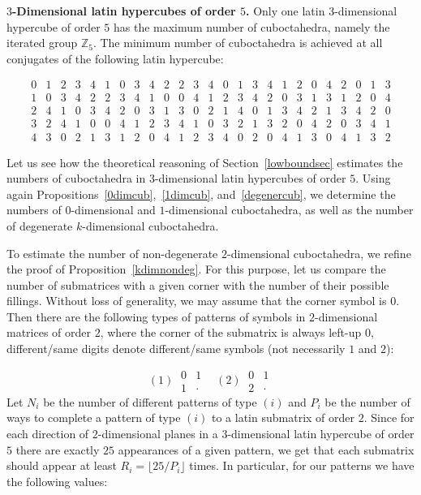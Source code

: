 \documentclass[a4paper]{article}
\begin{document}
\textbf{$3$-Dimensional latin hypercubes of order $5$.}   
Only  one latin $3$-dimensional  hypercube of order $5$ has the maximum number of cuboctahedra,  namely the iterated group $\mathbb{Z}_5$. The minimum number of cuboctahedra is achieved at all   conjugates of  the following latin hypercube:

$$
\begin{array}{ccccc|ccccc|ccccc|ccccc|ccccc}
0 & 1 & 2 & 3 & 4 &  1 & 0 & 3 & 4 & 2 &  2 & 3 & 4 & 0 & 1 &  3 & 4 & 1 & 2 & 0 &  4 & 2 & 0 & 1 & 3 \\
1 & 0 & 3 & 4 & 2 &  2 & 3 & 4 & 1 & 0 &  0 & 4 & 1 & 2 & 3 &  4 & 2 & 0 & 3 & 1 &  3 & 1 & 2 & 0 & 4 \\
2 & 4 & 1 & 0 & 3 &  4 & 2 & 0 & 3 & 1 &  3 & 0 & 2 & 1 & 4 &  0 & 1 & 3 & 4 & 2 &  1 & 3 & 4 & 2 & 0 \\
3 & 2 & 4 & 1 & 0 &  0 & 4 & 1 & 2 & 3 &  4 & 1 & 0 & 3 & 2 &  1 & 3 & 2 & 0 & 4 &  2 & 0 & 3 & 4 & 1 \\ 
4 & 3 & 0 & 2 & 1 &  3 & 1 & 2 & 0 & 4 &  1 & 2 & 3 & 4 & 0 &  2 & 0 & 4 & 1 & 3 &  0 & 4 & 1 & 3 & 2 
\end{array}
$$


Let us see how the theoretical reasoning of  Section~\ref{lowboundsec}  estimates  the numbers of cuboctahedra in $3$-dimensional latin hypercubes of order $5$.   Using again Propositions~\ref{0dimcub},~\ref{1dimcub}, and~\ref{degenercub},  we determine the numbers of  $0$-dimensional and $1$-dimensional cuboctahedra,  as well as the number of degenerate $k$-dimensional cuboctahedra.


To estimate the number of non-degenerate $2$-dimensional cuboctahedra, we refine  the proof of Proposition~\ref{kdimnondeg}. For this purpose, let us compare the number of submatrices with a given corner with the number of their possible fillings.  Without loss of generality, we may assume that the corner symbol is $0$. Then there are the following types of patterns of symbols in $2$-dimensional matrices of order $2$, where the corner of the submatrix is  always left-up   $0$,   different/same digits denote different/same symbols (not necessarily $1$ and $2$):

$$
(1) ~\begin{array}{cc}
0 & 1 \\ 1 & \cdot
\end{array} ~~~~
(2) ~ \begin{array}{cc}
0 & 1 \\ 2 & \cdot
\end{array}
$$
Let $N_i$ be the number of  different patterns of type $(i)$ and  $P_i$ be the number of ways to complete a pattern of type   $(i)$ to a latin submatrix of order $2$. Since for each direction of $2$-dimensional planes in a  $3$-dimensional latin hypercube of order $5$ there are exactly $25$ appearances of a given pattern, we get that each submatrix should appear at least   $R_i = \lfloor 25  / P_i  \rfloor$ times. In particular, for our patterns we have the following values:
\end{document}
